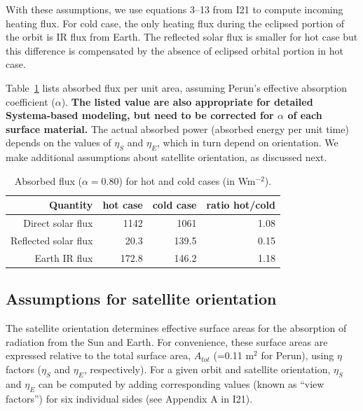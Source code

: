 \documentclass[]{aastex62}
\begin{document}
With these assumptions, we use equations 3--13 from I21 to compute incoming heating flux.
For cold case, the only heating flux during the eclipsed portion of the orbit is IR flux from Earth. 
The reflected solar flux is smaller for hot case but this difference is compensated by the absence 
of eclipsed orbital portion in hot case. 

Table~\ref{tab:inputflux} lists absorbed flux per unit area, assuming Perun's effective 
absorption coefficient ($\alpha$). {\bf The listed value are also appropriate for detailed 
Systema-based modeling, but need to be corrected for $\alpha$ of each surface material.} 
The actual absorbed power (absorbed energy per unit time) depends on 
the values of $\eta_S$ and $\eta_E$, which in turn depend on orientation. We make additional 
assumptions about satellite orientation, as discussed next. 

\begin{table}[t]
	\centering
	\caption{Absorbed flux ($\alpha=0.80$) for hot and cold cases (in  Wm$^{-2}$). }
	\label{tab:inputflux}
	\begin{tabular}{r|r|r|r} %
		\hline
  	                    Quantity  & hot case   &   cold  case &   ratio hot/cold    \\
		\hline
              Direct solar flux    &    1142        &     1061         &     1.08       \\
           Reflected solar flux  &     20.3        &     139.5        &     0.15     \\    
                       Earth IR flux  &   172.8       &     146.2        &     1.18      \\
		\hline
	\end{tabular} 
\end{table}



\subsection{Assumptions for satellite orientation}

The satellite orientation determines effective surface areas for the absorption of radiation from 
the Sun and Earth. For convenience, these surface areas are expressed relative to the total surface area, $A_{tot}$
(=0.11 m$^2$ for Perun), using $\eta$ factors ($\eta_S$ and $\eta_E$, respectively). For a given 
orbit and satellite orientation, $\eta_S$ and $\eta_E$ can be computed by adding corresponding
values (known as ``view factors'') for six individual sides (see Appendix A in I21).  
\end{document}
